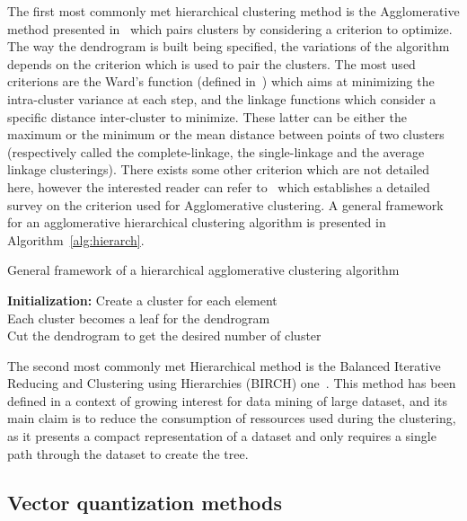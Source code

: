 \documentclass[a4paper]{report}
\begin{document}
    The first most commonly met hierarchical clustering method is the Agglomerative method presented in~\cite{ward1963hierarchical} which pairs clusters by considering a criterion to optimize. The way the dendrogram is built being specified, the variations of the algorithm depends on the criterion which is used to pair the clusters. The most used criterions are the Ward's function (defined in~\cite{ward1963hierarchical}) which aims at minimizing the intra-cluster variance at each step, and the linkage functions which consider a specific distance inter-cluster to minimize. These latter can be either the maximum or the minimum or the mean distance between points of two clusters (respectively called the complete-linkage, the single-linkage and the average linkage clusterings). There exists some other criterion which are not detailed here, however the interested reader can refer to~\cite{murtagh1983survey} which establishes a detailed survey on the criterion used for Agglomerative clustering. A general framework for an agglomerative hierarchical clustering algorithm is presented in Algorithm~\ref{alg:hierarch}.\\

    \begin{algorithm}[H]
        \caption{General framework of a hierarchical agglomerative clustering algorithm}
        \textbf{Initialization:} Create a cluster for each element\\
        Each cluster becomes a leaf for the dendrogram\\
        Cut the dendrogram to get the desired number of cluster
\label{alg:hierarch}
    \end{algorithm}

    \vspace{0.8cm}

    The second most commonly met Hierarchical method is the Balanced Iterative Reducing and Clustering using Hierarchies (BIRCH) one~\cite{zhang1997birch}. This method has been defined in a context of growing interest for data mining of large dataset, and its main claim is to reduce the consumption of ressources used during the clustering, as it presents a compact representation of a dataset and only requires a single path through the dataset to create the tree.

    \subsection{Vector quantization methods}
\label{sec:cluster_vector_quantization}
\end{document}
